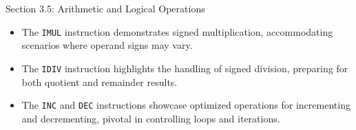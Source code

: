 \begin{notes}{Section 3.5: Arithmetic and Logical Operations}
\begin{highlight}
        \begin{itemize}
            \item The \texttt{IMUL} instruction demonstrates signed multiplication, accommodating scenarios where operand signs may vary.
            \item The \texttt{IDIV} instruction highlights the handling of signed division, preparing for both quotient and remainder results.
            \item The \texttt{INC} and \texttt{DEC} instructions showcase optimized operations for incrementing and decrementing, pivotal in controlling loops and iterations.
        \end{itemize}
    \end{highlight}    
\end{notes}